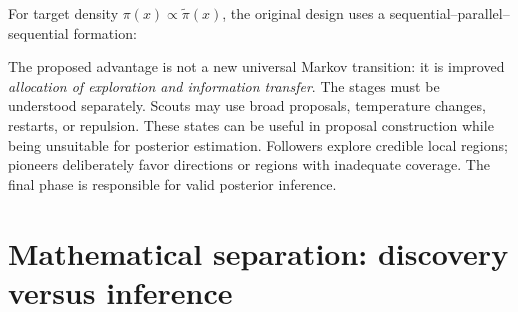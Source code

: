 \documentclass[11pt,letterpaper]{article}
\begin{document}
For target density \(\pi(x)\propto\widetilde\pi(x)\), the original design uses a sequential--parallel--sequential formation:
\begin{center}
\end{center}
The proposed advantage is not a new universal Markov transition: it is improved \emph{allocation of exploration and information transfer}. The stages must be understood separately. Scouts may use broad proposals, temperature changes, restarts, or repulsion. These states can be useful in proposal construction while being unsuitable for posterior estimation. Followers explore credible local regions; pioneers deliberately favor directions or regions with inadequate coverage. The final phase is responsible for valid posterior inference.

\section{Mathematical separation: discovery versus inference}
\end{document}
